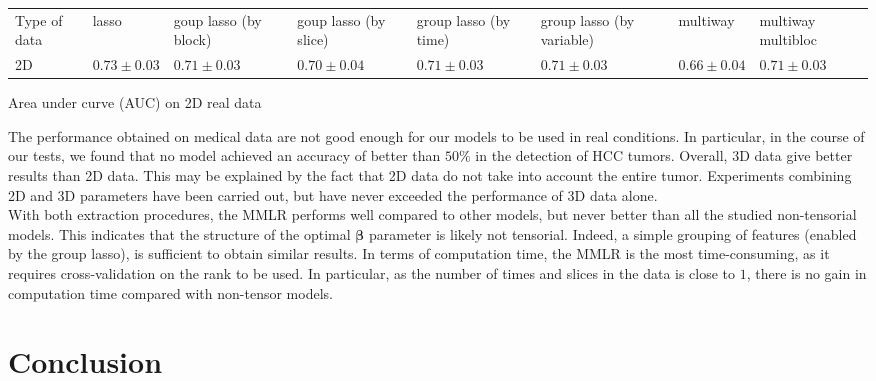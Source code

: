 \documentclass[preprint,12pt]{elsarticle}
\begin{document}
\begin{table}[tbp]
\begin{adjustbox}{center}
\begin{tabular}{|>{\centering\arraybackslash}m{2cm}|>{\centering\arraybackslash}m{2cm}|>{\centering\arraybackslash}m{2cm}|>{\centering\arraybackslash}m{2cm}|>{\centering\arraybackslash}m{2.5cm}|>{\centering\arraybackslash}m{2.5cm}|>{\centering\arraybackslash}m{2cm}|>{\centering\arraybackslash}m{2cm}|}
    \cline{1-8}
    Type of data & lasso & goup lasso (by block) & goup lasso (by slice)& group lasso (by time)& group lasso (by variable) & multiway & multiway multibloc\\
    \cline{1-8} 
    2D & $0.73 \pm 0.03$ & $0.71 \pm 0.03$ & $0.70 \pm 0.04$ & $0.71 \pm 0.03 $  & $0.71 \pm 0.03$ & $0.66 \pm 0.04$ & $0.71 \pm 0.03$ \\
    \cline{1-8}
\end{tabular}
\end{adjustbox}
\parbox{0.9\textwidth}{
\vspace{0.2 cm}    
\centering \small Area under curve (AUC) on 2D real data}
\end{table}
The performance obtained on medical data are not good enough for our models to be used in real conditions. In particular, in the course of our tests, we found that no model achieved an accuracy of better than $50\%$ in the detection of HCC tumors. Overall, 3D data give better results than 2D data. This may be explained by the fact that 2D data do not take into account the entire tumor. Experiments combining 2D and 3D parameters have been carried out, but have never exceeded the performance of 3D data alone.\\
\indent With both extraction procedures, the MMLR performs well compared to other models, but never better than all the studied non-tensorial models. This indicates that the structure of the optimal $\bm{\beta}$ parameter is likely not tensorial. Indeed, a simple grouping of features (enabled by the group lasso), is sufficient to obtain similar results. In terms of computation time, the MMLR is the most time-consuming, as it requires cross-validation on the rank to be used. In particular, as the number of times and slices in the data is close to $1$, there is no gain in computation time compared with non-tensor models.\\


\section{Conclusion}
\end{document}
